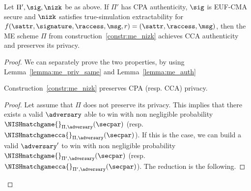 \begin{theorem}\label{theo:me_nizk_auth}
    Let $\Pi', \sig, \nizk$ be as above.
    If $\Pi'$ has CPA authenticity, $\sig$ is EUF-CMA secure and $\nizk$ satisfies true-simulation extractability for $f(\sattr, \signature, \raccess, \msg, r) = (\sattr, \raccess, \msg)$, then the ME scheme $\Pi$ from construction~\ref{constr:me_nizk} achieves CCA authenticity and preserves its privacy.
\end{theorem}

\begin{proof}
    We can separately prove the two properties, by using Lemma~\ref{lemma:me_priv_same} and Lemma~\ref{lemma:me_auth}

    \begin{lemma}\label{lemma:me_priv_same}
        Construction~\ref{constr:me_nizk} preserves CPA (resp. CCA) privacy.
        \begin{proof}
            Let assume that $\Pi$ does not preserve its privacy. This implies that there exists a valid $\adversary$ able to win with non negligible probability $\NISHmatchgame{}_{\Pi, \adversary}(\secpar)$ (resp. $\NISHmatchgamecca{}_{\Pi, \adversary}(\secpar)$). If this is the case, we can build a valid $\adversary'$ to win with non negligible probability $\NISHmatchgame{}_{\Pi', \adversary}(\secpar)$ (resp. $\NISHmatchgamecca{}_{\Pi', \adversary}(\secpar)$). The reduction is the following.


\end{proof}
\end{lemma}
\end{proof}
